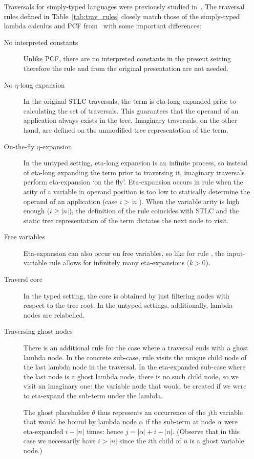 \documentclass{article}
\theoremstyle{definition}
\newcommand{\ghostlmd}{{\lambda\!\!\lambda}}
\newcommand{\ghostvar}{\theta}
\begin{document}
Traversals for simply-typed languages were previously studied in~\cite{BlumPhd}.
The traversal rules defined in Table~\ref{tab:trav_rules} closely match those of the simply-typed lambda calculus and PCF from~\cite{BlumPhd} with some important differences:
\begin{description}
  \item[No interpreted constants] Unlike PCF, there are no interpreted constants in the present setting therefore the rule  and  from the original presentation are not needed.

  \item[No $\eta$-long expansion] In the original STLC traversals, the term is eta-long expanded prior to calculating the set of traversals. This guarantees that the operand of an application always exists in the tree.
  Imaginary traversals, on the other hand, are defined on the unmodified tree representation of the term.

  \item[On-the-fly $\eta$-expansion] In the untyped setting, eta-long expansion is an infinite process, so instead of eta-long expanding the term prior to traversing it, imaginary traversals perform eta-expansion  `on the fly'. Eta-expansion occurs in rule  when the arity of a variable in operand position is too low to statically determine the operand of an application (case $i>|n|$). When the variable arity is high enough ($i\geq|n|$), the definition of the rule coincides with STLC and the static tree representation of the term dictates the next node to visit.

  \item[Free variables] Eta-expansion can also occur on free variables, so like for  rule , the input-variable rule allows for infinitely many eta-expansions ($k>0$).

  \item[Traversl core] In the typed setting, the core is  obtained by just filtering nodes with respect to the tree root. In the untyped settings, additionally, lambda nodes are relabelled.

  \item[Traversing ghost nodes] There is an additional rule \rulenamet{Lam^\ghostlmd} for the case where a traversal ends with a ghost lambda node. In the concrete sub-case, rule  visits the unique child node of the last lambda node in the traversal. In the eta-expanded sub-case where the last node is a ghost lambda node, there is no such child node, so we visit an imaginary one: the variable node that would be created if we were to eta-expand the sub-term under the lambda.

   The ghost placeholder $\ghostvar$ thus represents an occurrence of the $j$th variable that would be bound by lambda node $\alpha$ if the sub-term at node $\alpha$ were eta-expanded $i-|n|$ times: hence $j = |\alpha| + i - |n|$.
   (Observe that in this case we necessarily have $i>|n|$ since the $i$th child of $n$ is a ghost variable node.)
\end{description}
\end{document}
